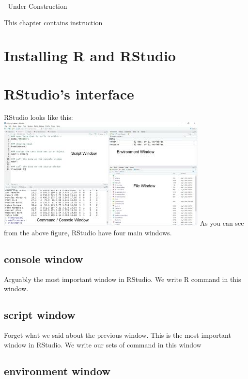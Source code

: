 \documentclass[
]{book}
\begin{document}
🚧 Under Construction 🚧

This chapter contains instruction

\hypertarget{installing-r-and-rstudio}{%
\section{Installing R and RStudio}\label{installing-r-and-rstudio}}

\hypertarget{rstudios-interface}{%
\section{RStudio's interface}\label{rstudios-interface}}

RStudio looks like this:
\includegraphics{tampilanR2.JPG}
As you can see from the above figure, RStudio have four main windows.

\hypertarget{console-window}{%
\subsection{console window}\label{console-window}}

Arguably the most important window in RStudio. We write R command in this window.

\hypertarget{script-window}{%
\subsection{script window}\label{script-window}}

Forget what we said about the previous window. This is the most important window in RStudio. We write our sets of command in this window

\hypertarget{environment-window}{%
\subsection{environment window}\label{environment-window}}
\end{document}

